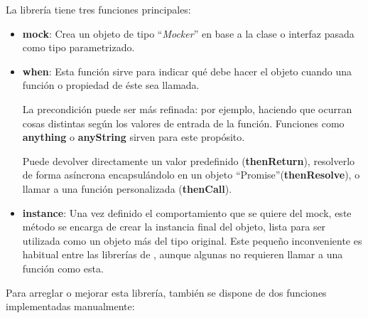 \documentclass[11pt,spanish,listoffigures,listoftables,table,hyphens,dvipsnames]{tfgetsinf}
\newcommand{\fe}[1]{\foreign{english}{#1}}
\begin{document}
La librería tiene tres funciones principales:
\begin{itemize}
   \item \textbf{mock}: Crea un objeto de tipo ``\emph{Mocker}'' en base a la clase o interfaz pasada como tipo parametrizado.

   \item \textbf{when}: Esta función sirve para indicar qué debe hacer el objeto cuando una función o propiedad de éste sea llamada.
   
   La precondición puede ser más refinada: por ejemplo, haciendo que ocurran cosas distintas según los valores de entrada de la función. Funciones como \textbf{anything} o \textbf{anyString} sirven para este propósito.

   Puede devolver directamente un valor predefinido (\textbf{thenReturn}), resolverlo de forma asíncrona encapsulándolo en un objeto ``Promise''(\textbf{thenResolve}), o llamar a una función personalizada (\textbf{thenCall}).

   \item \textbf{instance}: Una vez definido el comportamiento que se quiere del mock, este método se encarga de crear la instancia final del objeto, lista para ser utilizada como un objeto más del tipo original. Este pequeño inconveniente es habitual entre las librerías de \fe{mocking}, aunque algunas no requieren llamar a una función como esta.
\end{itemize}

Para arreglar o mejorar esta librería, también se dispone de dos funciones implementadas manualmente:
\end{document}
